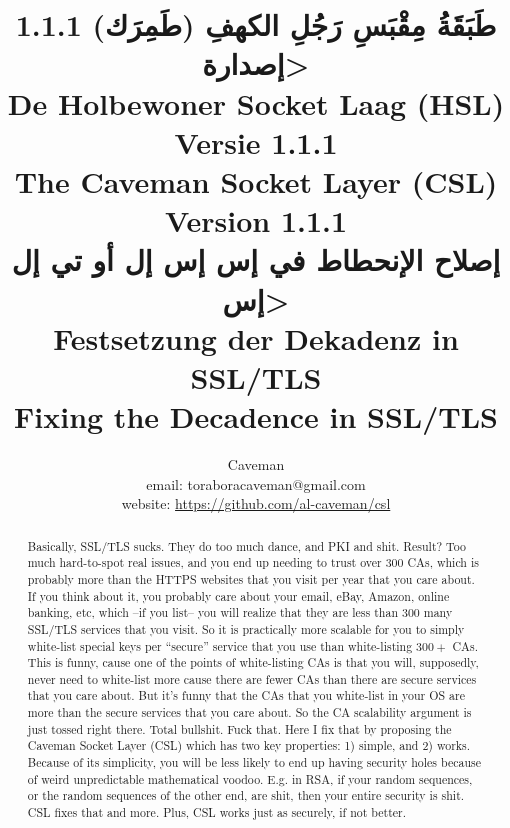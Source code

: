 \documentclass{article}
\author{Caveman\\
email: toraboracaveman@gmail.com\\
website: \url{https://github.com/al-caveman/csl}}
\title{
1.1.1 \<طَبَقَةُ مِقْبَسِ رَجُلِ الكهفِ (طَمِرَك) إصدارة>\\
De Holbewoner Socket Laag (HSL) Versie 1.1.1\\
The Caveman Socket Layer (CSL) Version 1.1.1\\
{\large \<إصلاح الإنحطاط في إس إس إل أو تي إل إس>}\\
{\large Festsetzung der Dekadenz in SSL/TLS}\\
{\large Fixing the Decadence in SSL/TLS}}
\begin{document}
 \maketitle
\begin{abstract}
    Basically, SSL/TLS sucks. They do too much dance, and PKI and shit. Result?
    Too much hard-to-spot real issues, and you end up needing to trust over
    $300$ CAs, which is probably more than the HTTPS websites that you visit
    per year that you care about. If you think about it, you probably care
    about your email, eBay, Amazon, online banking, etc, which --if you list--
    you will realize that they are less than $300$ many SSL/TLS services that
    you visit. So it is practically more scalable for you to simply white-list
    special keys per ``secure'' service that you use than white-listing $300+$
    CAs. This is funny, cause one of the points of white-listing CAs is that
    you will, supposedly, never need to white-list more cause there are fewer
    CAs than there are secure services that you care about. But it's funny that
    the CAs that you white-list in your OS are more than the secure services
    that you care about. So the CA scalability argument is just tossed right
    there. Total bullshit. Fuck that. Here I fix that by proposing the Caveman
    Socket Layer (CSL) which has two key properties: 1) simple, and 2) works.
    Because of its simplicity, you will be less likely to end up having
    security holes because of weird unpredictable mathematical voodoo. E.g. in
    RSA, if your random sequences, or the random sequences of the other end,
    are shit, then your entire security is shit.  CSL fixes that and more.
    Plus, CSL works just as securely, if not better.
\end{abstract}

\tableofcontents
\end{document}

